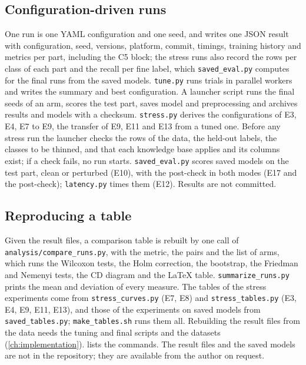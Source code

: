\subsection{Configuration-driven runs}
\label{sec:harness-config}

One run is one YAML configuration and one seed, and writes one JSON result with configuration,
seed, versions, platform, commit, timings, training history and metrics per part, including the
C5 block; the stress runs also record the rows per class of each part and the recall per fine label,
which \texttt{saved\_eval.py} computes for the final runs from the saved models. \texttt{tune.py} runs trials in
parallel workers and writes the summary and best configuration. A launcher script runs the final
seeds of an arm, scores the test part, saves model and preprocessing and archives results and
models with a checksum. \texttt{stress.py} derives the configurations of E3, E4, E7 to E9, the
transfer of E9, E11 and E13 from a tuned one. Before any stress run the launcher checks the rows
of the data, the held-out labels, the classes to be thinned, and that each knowledge base applies
and its columns exist; if a check fails, no run starts. \texttt{saved\_eval.py} scores saved
models on the test part, clean or perturbed (E10), with the post-check in both modes (E17 and the
post-check); \texttt{latency.py} times them (E12). Results are not committed.

\subsection{Reproducing a table}
\label{sec:harness-reproduce}

Given the result files, a comparison table is rebuilt by one call of
\texttt{analysis/compare\_runs.py}, with the metric, the pairs and the list of arms, which
runs the Wilcoxon tests, the Holm correction, the bootstrap, the Friedman and Nemenyi tests,
the CD diagram and the \LaTeX{} table. \texttt{summarize\_runs.py} prints the mean and
deviation of every measure. The tables of the stress experiments come from
\texttt{stress\_curves.py} (E7, E8) and \texttt{stress\_tables.py} (E3, E4, E9, E11, E13), and
those of the experiments on saved models from \texttt{saved\_tables.py}; \texttt{make\_tables.sh}
runs them all. Rebuilding the result files from the data needs the tuning and final scripts and
the datasets (\cref{ch:implementation}).  lists the commands. The result files
and the saved models are not in the repository; they are available from the author on request.

